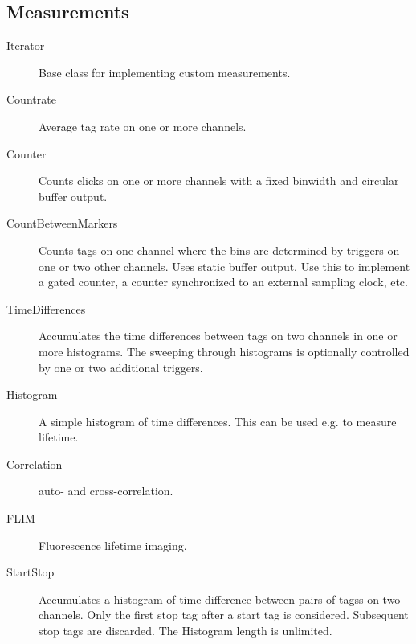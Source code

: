 \documentclass[letterpaper,10pt,english]{sphinxmanual}
\begin{document}
\subsection{Measurements}
\label{sections/api:measurements}\begin{description}
\item[{Iterator}] \leavevmode
Base class for implementing custom measurements.

\item[{Countrate}] \leavevmode
Average tag rate on one or more channels.

\item[{Counter}] \leavevmode
Counts clicks on one or more channels with a fixed binwidth and
circular buffer output.

\item[{CountBetweenMarkers}] \leavevmode
Counts tags on one channel where the bins are
determined by triggers on one or two other channels. Uses static buffer
output. Use this to implement a gated counter, a counter synchronized to
an external sampling clock, etc.

\item[{TimeDifferences}] \leavevmode
Accumulates the time differences between tags on two
channels in one or more histograms. The sweeping through
histograms is optionally controlled by one or two additional triggers.

\item[{Histogram}] \leavevmode
A simple histogram of time differences. This can be used e.g.
to measure lifetime.

\item[{Correlation}] \leavevmode
auto- and cross-correlation.

\item[{FLIM}] \leavevmode
Fluorescence lifetime imaging.

\item[{StartStop}] \leavevmode
Accumulates a histogram of time difference between
pairs of tagss on two channels. Only the first stop tag after a start tag is
considered. Subsequent stop tags are discarded. The Histogram length is
unlimited.

\end{description}
\end{document}
